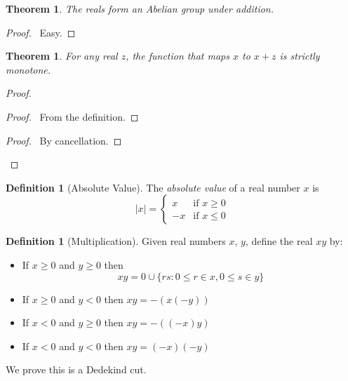 \documentclass{article}
\let\qed\relax
\newtheorem{theorem}[axiom]{Theorem}
\theoremstyle{definition}
\newtheorem{definition}[axiom]{Definition}
\begin{document}
    \begin{theorem}
        The reals form an Abelian group under addition.
    \end{theorem}

    \begin{proof}
        \pf\ Easy. \qed
    \end{proof}

    \begin{theorem}
        For any real $z$, the function that maps $x$ to $x + z$ is strictly monotone.
    \end{theorem}

    \begin{proof}
        \pf
        \begin{proof}
            \pf\ From the definition.
        \end{proof}
        \begin{proof}
            \pf\ By cancellation.
        \end{proof}
        \qed
    \end{proof}

    \begin{definition}[Absolute Value]
        The \emph{absolute value} of a real number $x$ is
        \[ |x| = \begin{cases}
            x & \text{if } x \geq 0 \\
            -x & \text{if } x \leq 0
        \end{cases} \]
    \end{definition}

    \begin{definition}[Multiplication]
        Given real numbers $x$, $y$, define the real $xy$ by:
        \begin{itemize}
            \item If $x \geq 0$ and $y \geq 0$ then
            \[ xy = 0 \cup \{ rs : 0 \leq r \in x, 0 \leq s \in y \} \]
            \item If $x \geq 0$ and $y < 0$ then $xy = -(x(-y))$
            \item If $x < 0$ and $y \geq 0$ then $xy = -((-x)y)$
            \item If $x < 0$ and $y < 0$ then $xy = (-x)(-y)$
        \end{itemize}

        We prove this is a Dedekind cut.
    \end{definition}
\end{document}
